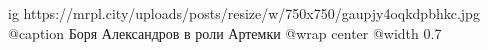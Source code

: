  
 
 
 
 

\ifcmt
  ig https://mrpl.city/uploads/posts/resize/w/750x750/gaupjy4oqkdpbhkc.jpg
	@caption Боря Александров в роли Артемки
  @wrap center
  @width 0.7
\fi
